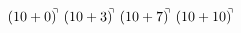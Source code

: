 \documentclass[preview]{standalone}
\begin{document}
\begin{align*}
(10+0)^{\hspace{-0.1cm}\urcorner} \ (10+3)^{\hspace{-0.1cm}\urcorner} \ (10+7)^{\hspace{-0.1cm}\urcorner} \ (10+10)^{\hspace{-0.1cm}\urcorner}
\end{align*}
\end{document}
